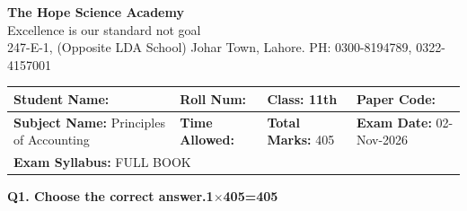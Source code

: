 \documentclass[11pt,a4paper]{article}
\begin{document}
\begin{center}
  {\Huge\bfseries The Hope Science Academy}\\[3pt]
  {\small Excellence is our standard not goal}\\[2pt]
  {\small 247-E-1, (Opposite LDA School) Johar Town, Lahore. PH: 0300-8194789, 0322-4157001}
\end{center}

\medskip
\noindent
\begin{tabularx}{\linewidth}{|X|X|X|X|}
\hline
\textbf{Student Name:} & \textbf{Roll Num:} & \textbf{Class:} 11th & \textbf{Paper Code:} \\ \hline
\textbf{Subject Name:} Principles of Accounting & \textbf{Time Allowed:} & \textbf{Total Marks:} 405 & \textbf{Exam Date:} 02-Nov-2026 \\ \hline
\multicolumn{4}{|l|}{\textbf{Exam Syllabus:} FULL BOOK} \\ \hline
\end{tabularx}

\bigskip
\noindent\textbf{Q1. Choose the correct answer.}\hfill\textbf{1$\times$405=405}
\end{document}
